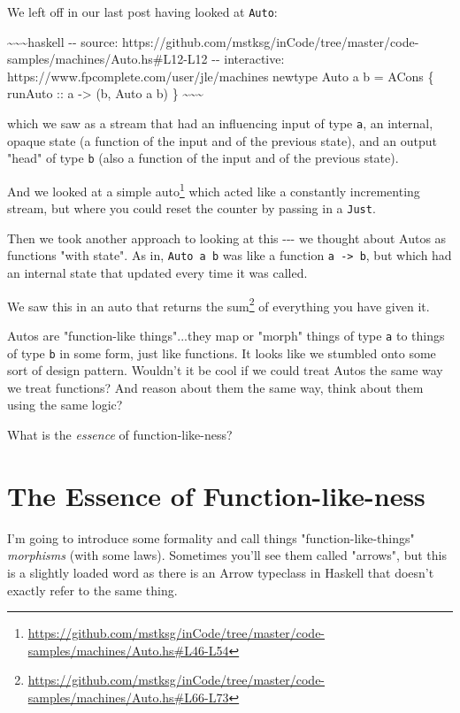\documentclass[]{article}
\renewcommand{\href}[2]{#2\footnote{\url{#1}}}
\begin{document}
We left off in our last post having looked at \texttt{Auto}:

\textasciitilde{}\textasciitilde{}\textasciitilde{}haskell -\/- source:
https://github.com/mstksg/inCode/tree/master/code-samples/machines/Auto.hs\#L12-L12
-\/- interactive: https://www.fpcomplete.com/user/jle/machines newtype Auto a b
= ACons \{ runAuto :: a -\textgreater{} (b, Auto a b) \}
\textasciitilde{}\textasciitilde{}\textasciitilde{}

which we saw as a stream that had an influencing input of type \texttt{a}, an
internal, opaque state (a function of the input and of the previous state), and
an output "head" of type \texttt{b} (also a function of the input and of the
previous state).

And we looked at
\href{https://github.com/mstksg/inCode/tree/master/code-samples/machines/Auto.hs\#L46-L54}{a
simple auto} which acted like a constantly incrementing stream, but where you
could reset the counter by passing in a \texttt{Just}.

Then we took another approach to looking at this -\/-\/- we thought about Autos
as functions "with state". As in, \texttt{Auto\ a\ b} was like a function
\texttt{a\ -\textgreater{}\ b}, but which had an internal state that updated
every time it was called.

We saw this in an auto that
\href{https://github.com/mstksg/inCode/tree/master/code-samples/machines/Auto.hs\#L66-L73}{returns
the sum} of everything you have given it.

Autos are "function-like things"...they map or "morph" things of type \texttt{a}
to things of type \texttt{b} in some form, just like functions. It looks like we
stumbled onto some sort of design pattern. Wouldn't it be cool if we could treat
Autos the same way we treat functions? And reason about them the same way, think
about them using the same logic?

What is the \emph{essence} of function-like-ness?

\section{The Essence of Function-like-ness}

I'm going to introduce some formality and call things "function-like-things"
\emph{morphisms} (with some laws). Sometimes you'll see them called "arrows",
but this is a slightly loaded word as there is an Arrow typeclass in Haskell
that doesn't exactly refer to the same thing.
\end{document}
